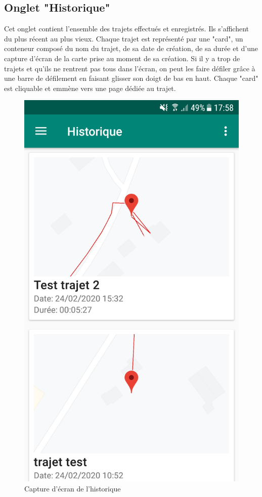 \subsection{Onglet "Historique"}
Cet onglet contient l'ensemble des trajets effectués et enregistrés. Ils s'affichent du plus récent au plus vieux. Chaque trajet est représenté
par une "card", un conteneur composé du nom du trajet, de sa date de création, de sa durée et d'une capture d'écran de la carte prise au moment
de sa création. Si il y a trop de trajets et qu'ils ne rentrent pas tous dans l'écran, on peut les faire défiler grâce à une barre de défilement
en faisant glisser son doigt de bas en haut. Chaque "card" est cliquable et emmène vers une page dédiée au trajet.
\begin{figure}[ht]
  \label{Historique}
  \centering
  \includegraphics[scale=0.13]{images/historique.png}
  \caption{Capture d'écran de l'historique}
\end{figure}

